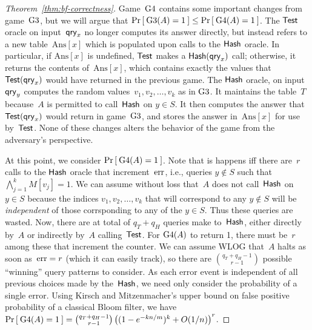 \begin{proof}[Theorem~\ref{thm:bf-correctness}]
Game~$\text{G4}$ contains some important changes from game~$\text{G3}$,
but we will argue that $\Pr\left[\: \text{G3}(A) = 1 \:\right] \leq \Pr\left[\: \text{G4}(A)
  = 1 \:\right]$. The $\mathsf{Test}$ oracle on input~$\mathsf{qry}_x$ no longer computes
its answer directly, but instead refers to a new table~$\mathrm{Ans}[x]$ which is populated upon calls to the
$\mathsf{Hash}$ oracle.  In particular, if $\mathrm{Ans}[x]$ is undefined, $\mathsf{Test}$ makes a $\mathsf{Hash}(\mathsf{qry}_x)$ call;
otherwise, it returns the contents of~$\mathrm{Ans}[x]$, which
contains exactly the values that~$\mathsf{Test}(\mathsf{qry}_x)$ would have
returned in the previous game.  The $\mathsf{Hash}$ oracle, on input~$\mathsf{qry}_y$ computes the random values~$v_1,v_2,\ldots,v_k$ as in
$\text{G3}$.  It maintains the table~$T$ because~$A$ is permitted to
call~$\mathsf{Hash}$ on $y \in S$.
It then computes the answer that~$\mathsf{Test}(\mathsf{qry}_x)$ would return in
game~$\text{G3}$, and stores the answer in~$\mathrm{Ans}[x]$ for use
by~$\mathsf{Test}$.  
None of these changes alters the behavior of the game from the
adversary's perspective.

At this point, we consider $\Pr\left[\: \text{G4}(A)=1 \:\right]$.  Note that is
happens iff there are~$r$ calls to the $\mathsf{Hash}$ oracle that
increment~$\mathrm{err}$, i.e., queries $y \not\in S$ such that
$\bigwedge_{j=1}^{k} M[v_j]=1$.  We can assume without loss that~$A$
does not call~$\mathsf{Hash}$ on $y \in S$ because the indices
$v_1,v_2,\ldots,v_k$ that will correspond to any $y \not\in S$ will be
\emph{independent} of those corrsponding to any of the $y \in S$.
Thus these queries are wasted.  Now, there are at total of $q_T + q_H$
queries make to~$\mathsf{Hash}$, either directly by~$A$ or indirectly
by~$A$ calling~$\mathsf{Test}$.  For $\text{G4}(A)$ to return 1, there
must be~$r$ among these that increment the counter.  We can assume
WLOG that~$A$ halts as soon as~$\mathrm{err}=r$ (which it can easily track),
so there are $\binom{q_T+q_H-1}{r-1}$ possible ``winning'' query
patterns to consider.  As each error event is independent of all
previous choices made by the~$\mathsf{Hash}$, we need only consider the
probability of a single error. Using Kirsch and Mitzenmacher's upper
bound on false positive probability of a classical Bloom filter, 
we have  $\Pr\left[\: \text{G4}(A)=1 \:\right] = \binom{q_T+q_H-1}{r-1}\left( (1-e^{-kn/m})^k + O(1/n) \right)^r$.


\end{proof}
